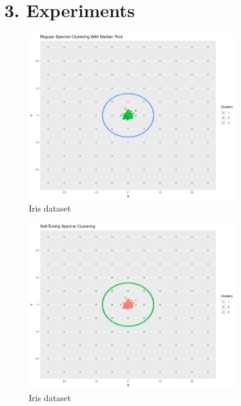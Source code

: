 \documentclass[aspectratio=169]{beamer}
\begin{document}
\section{3. Experiments}
\begin{frame}{}
    \begin{figure}
      \centering
      \includegraphics[width=0.8\textwidth]{code/regularSC.png}
      \caption{Iris dataset}
    \end{figure}
\end{frame}

\begin{frame}{}
  \begin{figure}
    \centering
    \includegraphics[width=0.8\textwidth]{code/STSC.png}
    \caption{Iris dataset}
  \end{figure}
\end{frame}
\end{document}
